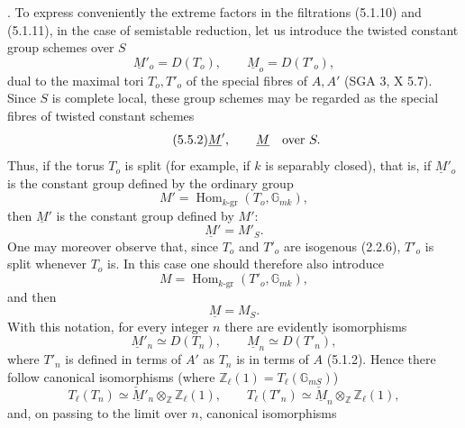 \par\medskip
{}. To express conveniently the extreme factors in the filtrations
(5.1.10) and (5.1.11), in the case of semistable reduction, let us
introduce the twisted constant group schemes over $S$
\begin{equation}\tag{5.5.1}
 \underline M'_o=D(T_o),\qquad \underline M_o=D(T'_o),
\end{equation}
dual to the maximal tori $T_o,T'_o$ of the special fibres of $A,A'$
(SGA 3, X 5.7). Since $S$ is complete local, these group schemes may
be regarded as the special fibres of twisted constant schemes
\begin{equation}\tag{5.5.2}
 \underline M',\qquad \underline M\quad\hbox{over }S.
\end{equation}
Thus, if the torus $T_o$ is split (for example, if $k$ is separably
closed), that is, if $\underline M'_o$ is the constant group defined
by the ordinary group
\begin{equation}\tag{5.5.3}
 M'=\operatorname{Hom}_{k\text{-}\mathrm{gr}}(T_o,\mathbb G_{mk}),
\end{equation}
then $\underline M'$ is the constant group defined by $M'$:
\begin{equation*}
 \underline M'=M'_S.
\end{equation*}
One may moreover observe that, since $T_o$ and $T'_o$ are isogenous
(2.2.6), $T'_o$ is split whenever $T_o$ is. In this case one should
therefore also introduce
\begin{equation}\tag{5.5.4}
 M=\operatorname{Hom}_{k\text{-}\mathrm{gr}}(T'_o,\mathbb G_{mk}),
\end{equation}
and then
\begin{equation*}
 \underline M=M_S.
\end{equation*}
With this notation, for every integer $n$ there are evidently
isomorphisms
\begin{equation}\tag{5.5.5}
 \underline M'_n\simeq D(T_n),\qquad
 \underline M_n\simeq D(T'_n),
\end{equation}
where $T'_n$ is defined in terms of $A'$ as $T_n$ is in terms of $A$
(5.1.2). Hence there follow canonical isomorphisms (where
$\mathbb Z_\ell(1)=T_\ell(\mathbb G_{mS})$)
\begin{equation}\tag{5.5.6}
 T_\ell(T_n)\simeq
 \check{\underline M}'_n\otimes_{\mathbb Z}\mathbb Z_\ell(1),
 \qquad
 T_\ell(T'_n)\simeq
 \check{\underline M}_n\otimes_{\mathbb Z}\mathbb Z_\ell(1),
\end{equation}
and, on passing to the limit over $n$, canonical isomorphisms
